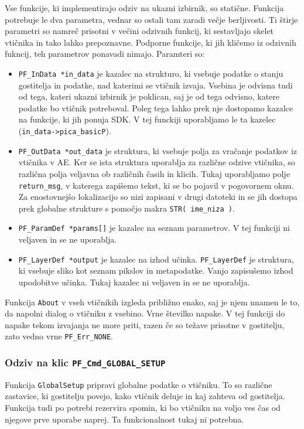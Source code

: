 \documentclass[a4paper, 12pt]{book}
\begin{document}
Vse funkcije, ki implementirajo odziv na ukazni izbirnik, so statične.
Funkcija potrebuje le dva parametra, vednar so ostali tam zaradi večje berljivosti\cite{aesdk}.
Ti štirje parametri so namreč prisotni v večini odzivnih funkcij, ki sestavljajo skelet vtičnika in tako lahko prepoznavne. %
Podporne funkcije, ki jih kličemo iz odzivnih fukncij, teh parametrov ponavadi nimajo.
Paramteri so:
\begin{itemize}
\item{\texttt{PF\_InData *in\_data} je kazalec na strukturo, ki vsebuje podatke o stanju gostitelja in podatke, nad katerimi se vtičnik izvaja. 
	Vsebina je odvisna tudi od tega, kateri ukazni izbirnik je poklican, saj je od tega odvisno, katere podatke bo vtičnik potreboval. 
	Poleg tega lahko prek nje dostopamo kazalce na funkcije, ki jih ponuja SDK. 
	V tej funckiji uporabljamo le ta kazelec (\texttt{in\_data->pica\_basicP}). }
\item{\texttt{PF\_OutData *out\_data} je struktura, ki vsebuje polja za vračanje podatkov iz vtičnika v AE. 
	Ker se ista struktura uporablja za različne odzive vtičnika, so različna polja veljavna ob različnih časih in klicih. 
	Tukaj uporabljamo polje \texttt{return\_msg}, v katerega zapišemo tekst, ki se bo pojavil v pogovornem oknu. 
	Za enostovnejšo lokalizacijo so nizi zapisani v drugi datoteki in se jih dostopa prek globalne strukture s pomočjo makra \texttt{STR( ime\_niza )}.  }
\item{\texttt{PF\_ParamDef *params[]} je kazalec na seznam parametrov. V tej funkciji ni veljaven in se ne uporablja.  }
\item{\texttt{PF\_LayerDef *output} je kazalec na izhod učinka. 
	\texttt{PF\_LayerDef} je struktura, ki vsebuje sliko kot seznam pikslov in metapodatke. 
	Vanjo zapisušemo izhod upodobitve učinka. Tukaj kazalec ni veljaven in se ne uporablja.  }
\end{itemize}

Funkcija \texttt{About} v vseh vtičnikih izgleda približno enako, saj je njem nnamen le to, da napolni dialog o vtičniku z vsebino.
Vrne številko napake.
V tej funkciji do napake tekom izvajanja ne more priti, razen če so težave prisotne v gostitelju, zato vedno vrne \texttt{PF\_Err\_NONE}.


\subsubsection{Odziv na klic \texttt{PF\_Cmd\_GLOBAL\_SETUP}}
Funkcija \texttt{GlobalSetup} pripravi globalne podatke o vtičniku. 
To so različne zastavice, ki gostitelju povejo, kako vtičnik deluje in kaj zahteva od gostitelja.
Funkcija tudi po potrebi rezervira spomin, ki bo vtičniku na voljo ves čas od njegove prve uporabe naprej.
Ta funkcionalnost tukaj ni potrebna.
\end{document}
